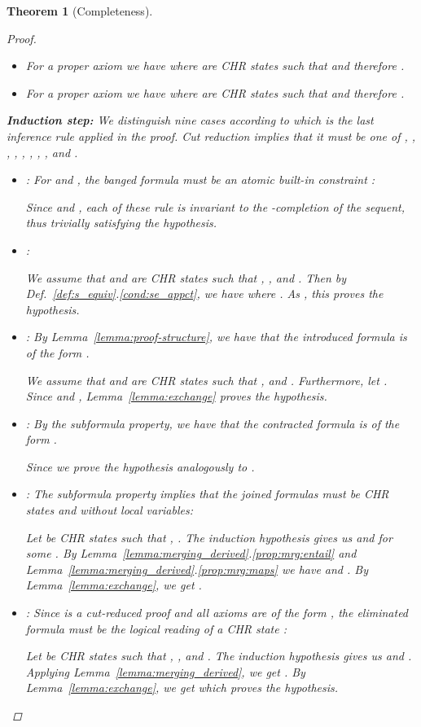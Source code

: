 \documentclass[acmtocl]{acmtrans2m}
\newtheorem{theorem}{Theorem}[section]
\begin{document}
\begin{theorem}[Completeness]
\begin{proof}
\begin{itemize}
		\item For a proper axiom  we have
		 where  are CHR states such
		that  and therefore .

		\item For a proper axiom  we have
		 where  are CHR states such that
		 and therefore .
	\end{itemize}

	\textbf{Induction step:} We distinguish nine cases according to
	which is the last inference rule applied in the proof. Cut reduction
	implies that it must be one of , , ,
	, , , , ,
	and .
	\begin{itemize}
	\item : For  and ,
	the banged formula must be an atomic built-in constraint :
	
	Since  and , each
	of these rule is invariant to the -completion of the sequent, thus
	trivially satisfying the hypothesis.
	\item :
	
	We assume that  and 
	are CHR states such that , ,
	and . Then by
	Def.~\ref{def:s_equiv}.\ref{cond:se_appct}, we have
	 where
	. As
	, this proves the hypothesis.
	\item : By Lemma~\ref{lemma:proof-structure}, we have that the
	introduced formula is of the form .
	
	We assume that  and  are
	CHR states such that ,  and
	. Furthermore,
	let . Since
	 and ,
	Lemma~\ref{lemma:exchange} proves the hypothesis.
	  \item : By the subformula property, we have that the
contracted
	  formula is of the form .
	  
	  Since 
	  we prove the hypothesis analogously to .

	  \item : The subformula property implies that the joined
	  formulas must be CHR states  and  without local variables:
	  
	  Let  be CHR states such that
	  ,
	  . The induction hypothesis gives us
	   and  for some . By
	  Lemma~\ref{lemma:merging_derived}.\ref{prop:mrg:entail} and
	  Lemma~\ref{lemma:merging_derived}.\ref{prop:mrg:maps} we have
	   and
	  . By
Lemma~\ref{lemma:exchange},
	  we get .

	  \item : Since  is a cut-reduced proof and all axioms are of the
	  form , the eliminated formula must be the logical reading of
	  a CHR state :
	  
	  Let  be CHR states such that
,
	  , and . The induction
	  hypothesis gives us  and . Applying
Lemma~\ref{lemma:merging_derived}, we get
	  . By
Lemma~\ref{lemma:exchange},
	  we get  which proves
	  the hypothesis.


\end{itemize}
\end{proof}
\end{theorem}
\end{document}
